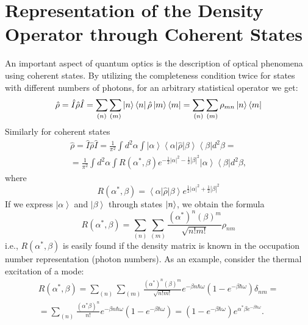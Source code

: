 \section{Representation of the Density Operator through Coherent States}
An important aspect of quantum optics is the description of optical phenomena using coherent states. By utilizing the completeness condition twice for states with different numbers of photons, for an arbitrary statistical operator we get: 
\[
\hat{\rho} = \hat{I}\hat{\rho}\hat{I} = 
\sum_{(n)}\sum_{(m)}
\ket{n}\bra{n}\hat{\rho}\ket{m}\bra{m} = 
\sum_{(n)}\sum_{(m)} \rho_{mn}\ket{n}\bra{m}
\]
Similarly for coherent states
\begin{eqnarray}
\hat{\rho} = \hat{I}\hat{\rho}\hat{I} = 
\frac{1}{\pi^2}\int d^2\alpha\int
\left|\alpha\right>\left<\alpha\right|\hat{\rho}\left|\beta\right>\left<\beta\right|
d^2 \beta = 
\nonumber \\
= \frac{1}{\pi^2} \int d^2\alpha \int
R\left(\alpha^{*}, \beta\right) e^{-\frac{1}{2}\left|\alpha\right|^2 -\frac{1}{2}\left|\beta\right|^2}
\left|\alpha\right>\left<\beta\right|d^2 \beta ,
\end{eqnarray}
where
\[
R\left(\alpha^{*}, \beta\right) =
\left<\alpha\right|\hat{\rho}\left|\beta\right>
e^{\frac{1}{2}\left|\alpha\right|^2 +\frac{1}{2}\left|\beta\right|^2}
\]
If we express $\left|\alpha\right>$ and $\left|\beta\right>$ through states $\ket{n}$, we obtain the formula 
\begin{equation}
R\left(\alpha^{*}, \beta\right) = \sum_{(n)}\sum_{(m)}
\frac{\left(\alpha^{*}\right)^n \left(\beta\right)^m}{\sqrt{n!m!}}\rho_{nm}
\end{equation}
i.e., $R\left(\alpha^{*}, \beta\right)$ is easily found if the density matrix is known 
in the occupation number representation (photon numbers). As an example, consider the thermal excitation of a mode: 
\begin{eqnarray}
R\left(\alpha^{*}, \beta\right) = \sum_{(n)}\sum_{(m)}
\frac{\left(\alpha^{*}\right)^n \left(\beta\right)^m}{\sqrt{n!m!}}
e^{-\beta n \hbar \omega}\left(1  -  e^{-\beta \hbar \omega}\right)
\delta_{nm} = 
\nonumber \\
= \sum_{(n)}\frac{\left(\alpha^{*} \beta\right)^n }{n!}
e^{-\beta n \hbar \omega}\left(1  -  e^{-\beta \hbar \omega}\right) =
\left(1  -  e^{-\beta \hbar \omega}\right) e^{\alpha^{*}\beta
  e^{-\beta \hbar \omega}}.
\end{eqnarray}

